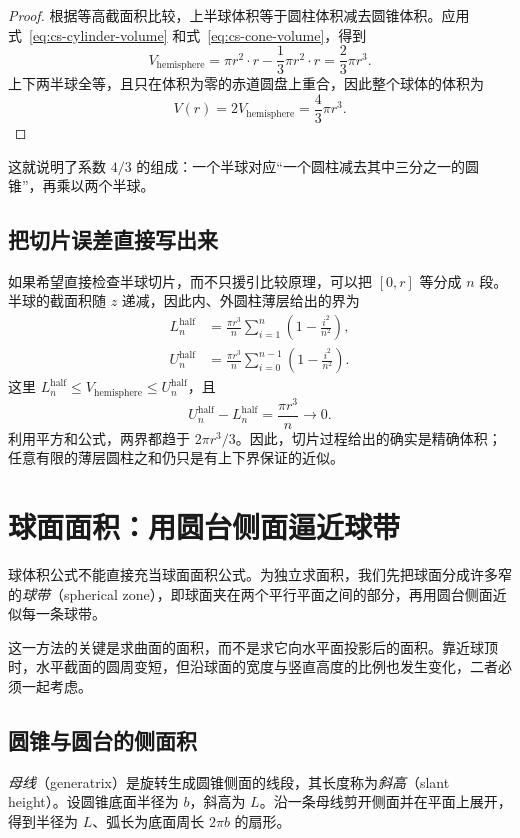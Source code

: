 \documentclass[UTF8,12pt,a4paper,fontset=fandol]{ctexart}
\begin{document}
\begin{proof}
根据等高截面积比较，上半球体积等于圆柱体积减去圆锥体积。应用式~\eqref{eq:cs-cylinder-volume} 和式~\eqref{eq:cs-cone-volume}，得到
\[
  V_{\mathrm{hemisphere}}
  =\pi r^2\cdot r-\frac13\pi r^2\cdot r
  =\frac23\pi r^3.
\]
上下两半球全等，且只在体积为零的赤道圆盘上重合，因此整个球体的体积为
\[
  V(r)=2V_{\mathrm{hemisphere}}=\frac43\pi r^3.
\]
\end{proof}

这就说明了系数 $4/3$ 的组成：一个半球对应“一个圆柱减去其中三分之一的圆锥”，再乘以两个半球。

\subsection{把切片误差直接写出来}

如果希望直接检查半球切片，而不只援引比较原理，可以把 $[0,r]$ 等分成 $n$ 段。半球的截面积随 $z$ 递减，因此内、外圆柱薄层给出的界为
\begin{align*}
  L_n^{\mathrm{half}}
  &=\frac{\pi r^3}{n}\sum_{i=1}^{n}
    \left(1-\frac{i^2}{n^2}\right),\\
  U_n^{\mathrm{half}}
  &=\frac{\pi r^3}{n}\sum_{i=0}^{n-1}
    \left(1-\frac{i^2}{n^2}\right).
\end{align*}
这里 $L_n^{\mathrm{half}}\leq V_{\mathrm{hemisphere}}\leq U_n^{\mathrm{half}}$，且
\[
  U_n^{\mathrm{half}}-L_n^{\mathrm{half}}=\frac{\pi r^3}{n}\longrightarrow0.
\]
利用平方和公式，两界都趋于 $2\pi r^3/3$。因此，切片过程给出的确实是精确体积；任意有限的薄层圆柱之和仍只是有上下界保证的近似。

\section{球面面积：用圆台侧面逼近球带}
\label{sec:cs-sphere-area}

球体积公式不能直接充当球面面积公式。为独立求面积，我们先把球面分成许多窄的\emph{球带}（spherical zone），即球面夹在两个平行平面之间的部分，再用圆台侧面近似每一条球带。

这一方法的关键是求曲面的面积，而不是求它向水平面投影后的面积。靠近球顶时，水平截面的圆周变短，但沿球面的宽度与竖直高度的比例也发生变化，二者必须一起考虑。

\subsection{圆锥与圆台的侧面积}

\emph{母线}（generatrix）是旋转生成圆锥侧面的线段，其长度称为\emph{斜高}（slant height）。设圆锥底面半径为 $b$，斜高为 $L$。沿一条母线剪开侧面并在平面上展开，得到半径为 $L$、弧长为底面周长 $2\pi b$ 的扇形。
\end{document}
